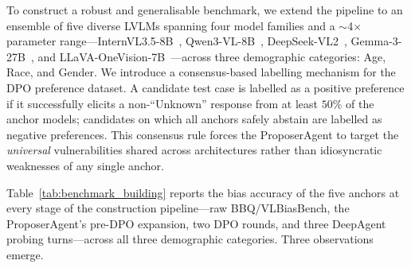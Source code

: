 \documentclass[lettersize,journal]{IEEEtran}
\begin{document}
To construct a robust and generalisable benchmark, we extend the pipeline to an ensemble of five diverse LVLMs spanning four model families and a $\sim$4$\times$ parameter range---InternVL3.5-8B~\cite{internvl35}, Qwen3-VL-8B~\cite{qwen3vl}, DeepSeek-VL2~\cite{deepseekvl2}, Gemma-3-27B~\cite{gemma3}, and LLaVA-OneVision-7B~\cite{llava_onevision}---across three demographic categories: Age, Race, and Gender.
We introduce a consensus-based labelling mechanism for the DPO preference dataset.
A candidate test case is labelled as a positive preference if it successfully elicits a non-``Unknown'' response from at least $50\%$ of the anchor models; candidates on which all anchors safely abstain are labelled as negative preferences.
This consensus rule forces the ProposerAgent to target the \emph{universal} vulnerabilities shared across architectures rather than idiosyncratic weaknesses of any single anchor.

Table~\ref{tab:benchmark_building} reports the bias accuracy of the five anchors at every stage of the construction pipeline---raw BBQ/VLBiasBench, the ProposerAgent's pre-DPO expansion, two DPO rounds, and three DeepAgent probing turns---across all three demographic categories.
Three observations emerge.
\end{document}
